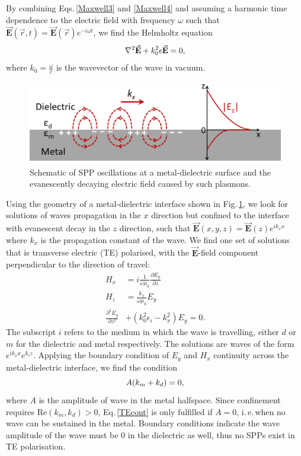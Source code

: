 By combining Eqs.\,\ref{Maxwell3} and \ref{Maxwell4} and assuming a harmonic time dependence to the electric field with frequency $\omega$ such that $\vec{\mathbf{E}}(\vec{r},t) = \vec{\mathbf{E}}(\vec{r})e^{-i\omega t}$, we find the Helmholtz equation
\begin{equation}
\centering
\nabla^2\vec{\mathbf{E}} + k_0^2\epsilon \vec{\mathbf{E}} = 0,
\label{Helmholz}
\end{equation}
where $k_0 = \frac{\omega}{c}$ is the wavevector of the wave in vacuum.
\begin{figure}[h!] 
\centering    
\includegraphics[width=\textwidth]{Fig1}
\caption{Schematic of SPP oscillations at a metal-dielectric surface and the evanescently decaying electric field caused by such plasmons.}
\label{3Fig1}
\end{figure}

Using the geometry of a metal-dielectric interface shown in Fig.\,\ref{3Fig1}, we look for solutions of waves propagation in the $x$ direction but confined to the interface with evanescent decay in the $z$ direction, such that $\vec{\mathbf{E}}(x,y,z)=\vec{\mathbf{E}}(z) e^{i k_x x}$ where $k_x$ is the propagation constant of the wave. We find one set of solutions that is transverse electric (TE) polarised, with the $\vec{\mathbf{E}}$-field component perpendicular to the direction of travel:
\begin{subequations}
\label{TEplasmons}
\begin{align}
H_x &= i \frac{1}{\omega \mu_0} \frac{\partial E_y}{\partial z}\\
H_z &= \frac{k_x}{\omega \mu_0} E_y\\
\frac{\partial^2 E_y}{\partial z^2} &+ (k_0^2 \epsilon_i-k_x^2)E_y = 0 .
\end{align}
\end{subequations}
The subscript $i$ refers to the medium in which the wave is travelling, either $d$ or $m$ for the dielectric and metal respectively. The solutions are waves of the form $e^{i k_x x} e^{k_i z}$. Applying the boundary condition of $E_y$ and $H_x$ continuity across the metal-dielectric interface, we find the condition 
\begin{equation}
\centering
A(k_m+k_d)=0 ,
\label{TEcont}
\end{equation}
where $A$ is the amplitude of wave in the metal halfspace. Since confinement requires Re$(k_m, k_d)>0$, Eq.\,\ref{TEcont} is only fulfilled if $A=0$, i.\,e.\,when no wave can be sustained in the metal. Boundary conditions indicate the wave amplitude of the wave must be 0 in the dielectric as well, thus no SPPs exist in TE polarisation.

